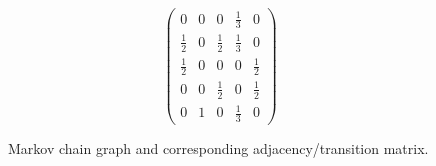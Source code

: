 \begin{figure}[H]
\begin{subfigure}[b]{0.48\textwidth}
    \end{subfigure}
    \hfill 
    \begin{subfigure}[b]{0.48\textwidth}
      \centering
      \begin{equation}
        \begin{pmatrix}0&0&0&\frac{1}{3}&0\\
        \frac{1}{2}&0&\frac{1}{2}&\frac{1}{3}&0\\
        \frac{1}{2}&0&0&0&\frac{1}{2}\\
        0&0&\frac{1}{2}&0&\frac{1}{2}\\
        0&1&0&\frac{1}{3}&0\end{pmatrix}
      \end{equation}
    \end{subfigure}
    \caption{Markov chain graph and corresponding adjacency/transition matrix.}
    \label{fig:markov_chain}
  \end{figure}

